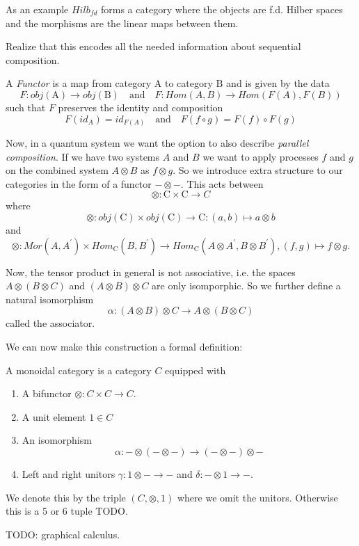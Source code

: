 As an example $Hilb_{fd}$ forms a category where the objects are f.d. Hilber spaces and the morphisms are the linear maps between them.

Realize that this encodes all the needed information about sequential composition.


\begin{definition}[Functor]
  \label{def:functor}
  A \emph{Functor} is a map from category $\mathrm{A} $ to category $\mathrm{B} $ and is given by the data
  \[
    F : obj(\mathrm{A} ) \to obj(\mathrm{B} ) \quad \text{and} \quad F : Hom(A,B) \to Hom(F(A), F(B))
  \]
  such that $F$ preserves the identity and composition
  \[
    F(id_A) = id_{F(A)} \quad \text{and} \quad F(f \circ g) = F(f) \circ F(g)
  \]
\end{definition}

Now, in a quantum system we want the option to also describe \emph{parallel composition}. If we have two systems $A$ and $B$ we want to apply processes $f$ and $g$ on the combined system $A \otimes B$ as $f \otimes g$. So we introduce extra structure to our categories in the form of a functor $- \otimes -$. This acts between 
\[
  \otimes : \mathrm{C} \times \mathrm{C} \to C
\]
where
\[
  \otimes : obj(\mathrm{C} ) \times obj(\mathrm{C} ) \to \mathrm{C} : (a,b) \mapsto a \otimes b
\]
and
\[
  \otimes : Mor(A,A^\prime) \times Hom_{\mathrm{C} }(B,B^\prime ) \to Hom_{\mathrm{C} }(A \otimes A^\prime , B \otimes B^\prime ), (f,g) \mapsto f \otimes g.
\]

Now, the tensor product in general is not associative, i.e. the spaces $A \otimes (B \otimes C)$ and $(A \otimes B) \otimes C$ are only isomporphic. So we further define a natural isomorphism
\[
  \alpha : (A \otimes B) \otimes C \to A \otimes (B \otimes C)
\]
called the associator.

We can now make this construction a formal definition:



\begin{definition}
  \label{def:monoidalCategory}
  A monoidal category is a category $C$ equipped with
  \begin{enumerate}
    \item A bifunctor $\otimes : C \times C \to C$.
    \item A unit element $1 \in C$
    \item An isomorphism
      \[
        \alpha : - \otimes (- \otimes -) \to (- \otimes -) \otimes -
      \]
    \item Left and right unitors $\gamma : 1 \otimes - \to -$ and $\delta : - \otimes 1 \to -$.
  \end{enumerate} 
  We denote this by the triple $(C,\otimes,1)$ where we omit the unitors. Otherwise this is a 5 or 6 tuple TODO.
\end{definition}

TODO: graphical calculus.
